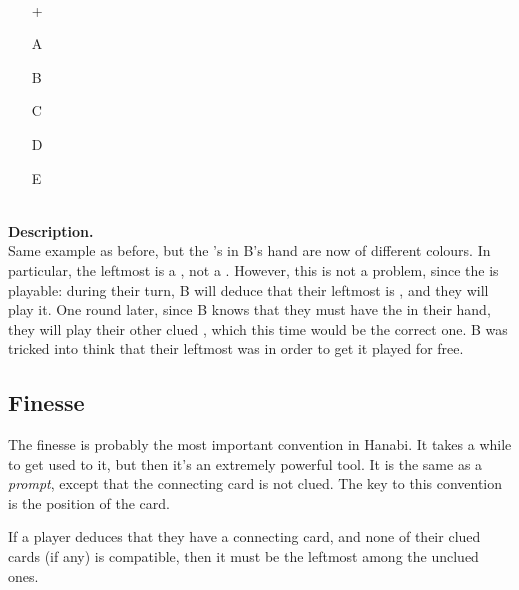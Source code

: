 \begin{example} \hfill \\
	\begin{minipage}{0.45\textwidth}
		\begin{itemize}
			\item[\Large +]      
			\item[\Large A]    
			\item[\Large B]    
			\item[\Large C]    
			\item[\Large D]    
			\item[\Large E]    
		\end{itemize}
	\end{minipage}%
	\begin{minipage}{0.55\textwidth}
		\hfill \\
		
		\textbf{Description.} \\
		
		Same example as before, but the 's in B's hand are now of different colours. In particular, the leftmost is a , not a . However, this is not a problem, since the  is playable: during their turn, B will deduce that their leftmost  is , and they will play it. One round later, since B knows that they must have the  in their hand, they will play their other clued , which this time would be the correct one. B was tricked into think that their leftmost  was  in order to get it played for free.
	\end{minipage}
\end{example} \vspace{0.15 cm}

\subsection{Finesse}
\label{sec:finesse}

The finesse is probably the most important convention in Hanabi. It takes a while to get used to it, but then it's an extremely powerful tool. It is the same as a \emph{prompt}, except that the connecting card is not clued. The key to this convention is the position of the card.

\begin{convention}[Finesse]
	\label{finesse}
	If a player deduces that they have a connecting card, and none of their clued cards (if any) is compatible, then it must be the leftmost among the unclued ones.
\end{convention}

